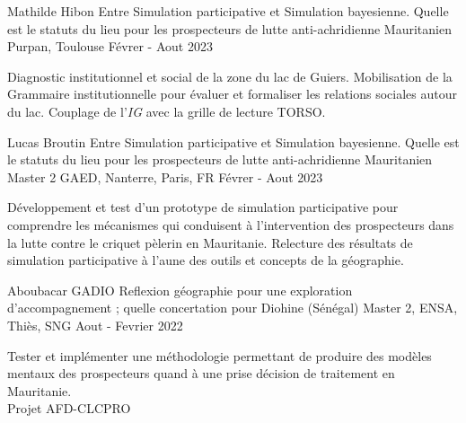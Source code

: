 \begin{cventries}
    \cventry
        {Mathilde Hibon} %
        {Entre Simulation participative et Simulation bayesienne. Quelle est le statuts du lieu pour les prospecteurs de lutte anti-achridienne Mauritanien} %
        {Purpan, Toulouse} %
        {Févrer - Aout 2023} %
        {
        \begin{cvitems} %
          Diagnostic institutionnel et social de la zone du lac de Guiers. Mobilisation de la Grammaire institutionnelle pour évaluer et formaliser les relations sociales autour du lac. Couplage de l'\textit{IG} avec la grille de lecture TORSO. 
        \end{cvitems}
        }
    \cventry
        {Lucas Broutin} %
        {Entre Simulation participative et Simulation bayesienne. Quelle est le statuts du lieu pour les prospecteurs de lutte anti-achridienne Mauritanien} %
        {Master 2 GAED, Nanterre, Paris, FR} %
        {Févrer - Aout 2023} %
        {
        \begin{cvitems} %
          Développement et test d'un prototype de simulation participative pour comprendre les mécanismes qui conduisent à l'intervention des prospecteurs dans la lutte contre le criquet pèlerin en Mauritanie. Relecture des résultats de simulation participative à l'aune des outils et concepts de la géographie.
        \end{cvitems}
        }
    \cventry
        {Aboubacar GADIO} %
        {Reflexion géographie pour une exploration d'accompagnement ; quelle concertation pour Diohine (Sénégal)} %
        {Master 2, ENSA, Thiès, SNG} %
        {Aout - Fevrier 2022} %
        {
        \begin{cvitems} %
            Tester et implémenter une méthodologie permettant de produire des modèles mentaux des prospecteurs quand à une prise décision de traitement en Mauritanie.\\
            Projet AFD-CLCPRO
        \end{cvitems}
        }


\end{cventries}
